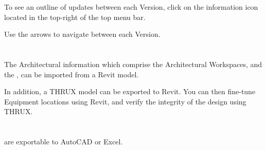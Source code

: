 \documentclass[letterpaper,10pt,english]{sphinxmanual}
\begin{document}
\begin{figure}[H]
\centering

\noindent{}
\end{figure}

To see an outline of updates between each Version, click on the information icon located in the top-right of the top menu bar.

\begin{figure}[H]
\centering

\noindent{}
\end{figure}

Use the arrows to navigate between each Version.

\begin{figure}[H]
\centering

\noindent{}
\end{figure}


\section{}
\label{\detokenize{docs/userguide/index-user_guide:revit-interoperability}}\label{\detokenize{docs/userguide/index-user_guide:id12}}
The Architectural information which comprise the Architectural Workspaces, {\hyperref[\detokenize{docs/userguide/definingarchitecturalelements/archelements/index-arch-elements:arch-elements}]{}} and the {\hyperref[\detokenize{docs/userguide/definingarchitecturalelements/floorplans/index-floor-plans:floor-plans}]{}}, can be imported from a Revit model.

In addition, a THRUX model can be exported to Revit.  You can then fine-tune Equipment locations using Revit, and verify the integrity of the design using THRUX.

\begin{figure}[H]
\centering

\noindent{}
\end{figure}


\section{}
\label{\detokenize{docs/userguide/index-user_guide:autocad-interoperability}}\label{\detokenize{docs/userguide/index-user_guide:id13}}
{\hyperref[\detokenize{docs/userguide/buildingelectricalmodel/schedules/index-schedules:schedules}]{}} are exportable to AutoCAD or Excel.
\end{document}

